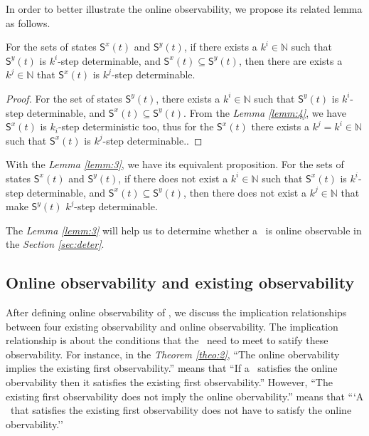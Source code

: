 In order to better illustrate the online observability, we propose its related lemma as follows.
\begin{lemma}
For the sets of states $\mathsf{S}^{x}(t)$ and $\mathsf{S}^{y}(t)$, if there exists a $k^{i}\in \mathbb{N}$ such that $\mathsf{S}^{y}(t)$ is $k^{i}$-step determinable, and $\mathsf{S}^{x}(t)\subseteq \mathsf{S}^{y}(t)$, then there are exists a $k^{j}\in \mathbb{N}$ that $\mathsf{S}^{x}(t)$ is $k^{j}$-step determinable.
\label{lemm:3}
\end{lemma}
\begin{proof}For the set of states $\mathsf{S}^{y}(t)$, there exists a $k^{i}\in \mathbb{N}$ such that $\mathsf{S}^{y}(t)$ is $k^{i}$-step determinable, and $\mathsf{S}^{x}(t)\subseteq \mathsf{S}^{y}(t)$. From the {\em Lemma \ref{lemm:4}}, we have $\mathsf{S}^{x}(t)$ is $k_i$-step deterministic too, thus for the $\mathsf{S}^{x}(t)$ there exists a $k^{j}=k^{i}\in \mathbb{N}$ such that $\mathsf{S}^{x}(t)$ is $k^{j}$-step determinable..
\end{proof}

With the {\em Lemma \ref{lemm:3}}, we have its equivalent proposition.
For the sets of states $\mathsf{S}^{x}(t)$ and $\mathsf{S}^{y}(t)$, if there does not exist a $k^{i}\in \mathbb{N}$ such that $\mathsf{S}^{x}(t)$ is $k^{i}$-step determinable, and $\mathsf{S}^{x}(t)\subseteq \mathsf{S}^{y}(t)$, then there does not exist a $k^{j}\in \mathbb{N}$ that make $\mathsf{S}^{y}(t)$ $k^{j}$-step determinable.


The {\em Lemma \ref{lemm:3}} will help us to determine whether a \BCN\ is online observable in the {\em Section \ref{sec:deter}}.
\subsection{Online observability and existing observability}
After defining online observability of \BCNs, we discuss the implication relationships between four existing observability and online observability. The implication relationship is about the conditions that the \BCNs\ need to meet to satify these observability. For instance, in the {\em Theorem \ref{theo:2}}, ``The online obervability implies the existing first observability.'' means that ``If a \BCN\ satisfies the online obervability then it satisfies the existing first observability.'' However, ``The existing first observability does not imply the online obervability.'' means that ```A \BCN\ that satisfies the existing first observability does not have to satisfy the online obervability.''

